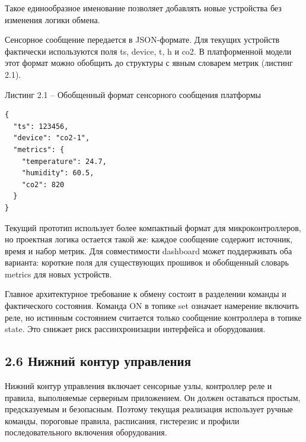 \documentclass[a4paper,14pt]{extarticle}
\renewcommand{\texttt}[1]{\textnormal{#1}}
\begin{document}
Такое единообразное именование позволяет добавлять новые устройства без
изменения логики обмена.

Сенсорное сообщение передается в JSON-формате. Для текущих устройств
фактически используются поля \texttt{ts}, \texttt{device}, \texttt{t},
\texttt{h} и \texttt{co2}. В платформенной модели этот формат можно
обобщить до структуры с явным словарем метрик (листинг 2.1).

Листинг 2.1 -- Обобщенный формат сенсорного сообщения платформы

\par\noindent\begin{minipage}{\linewidth}
\begin{verbatim}
{
  "ts": 123456,
  "device": "co2-1",
  "metrics": {
    "temperature": 24.7,
    "humidity": 60.5,
    "co2": 820
  }
}
\end{verbatim}
\end{minipage}\par

Текущий прототип использует более компактный формат для
микроконтроллеров, но проектная логика остается такой же: каждое
сообщение содержит источник, время и набор метрик. Для совместимости
dashboard может поддерживать оба варианта: короткие поля для
существующих прошивок и обобщенный словарь \texttt{metrics} для новых
устройств.

Главное архитектурное требование к обмену состоит в разделении команды и
фактического состояния. Команда \texttt{ON} в топике \texttt{set}
означает намерение включить реле, но истинным состоянием считается
только сообщение контроллера в топике \texttt{state}. Это снижает риск
рассинхронизации интерфейса и оборудования.

\hypertarget{ux43dux438ux436ux43dux438ux439-ux43aux43eux43dux442ux443ux440-ux443ux43fux440ux430ux432ux43bux435ux43dux438ux44f}{%
\subsection{2.6 Нижний контур
управления}\label{ux43dux438ux436ux43dux438ux439-ux43aux43eux43dux442ux443ux440-ux443ux43fux440ux430ux432ux43bux435ux43dux438ux44f}}

Нижний контур управления включает сенсорные узлы, контроллер реле и
правила, выполняемые серверным приложением. Он должен оставаться
простым, предсказуемым и безопасным. Поэтому текущая реализация
использует ручные команды, пороговые правила, расписания, гистерезис и
профили последовательного включения оборудования.
\end{document}
